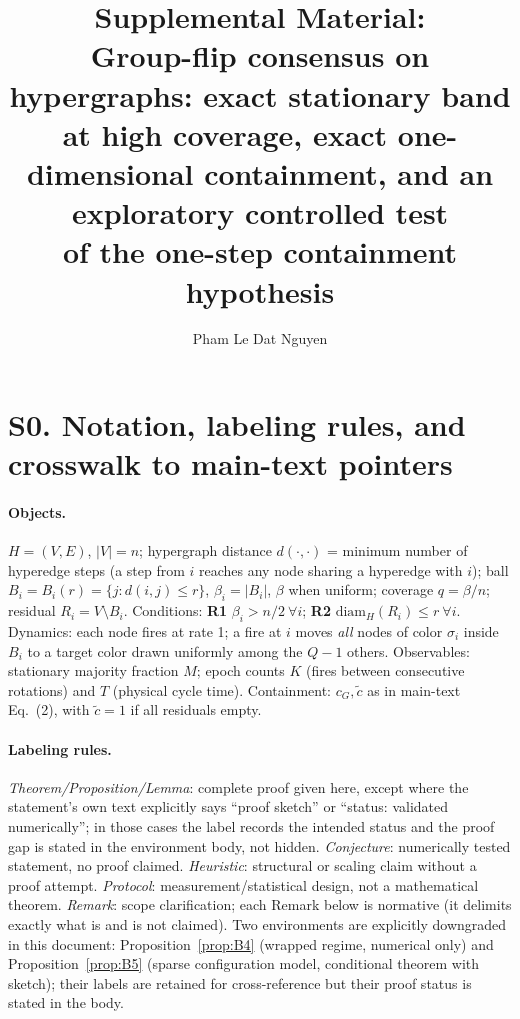 \documentclass[preprint,12pt]{elsarticle}
\newcommand{\ctil}{\tilde{c}}
\newcommand{\cG}{c_G}
\begin{document}
\begin{frontmatter}

\title{Supplemental Material:\\
Group-flip consensus on hypergraphs: exact stationary band at high coverage,
exact one-dimensional containment, and an exploratory controlled test\\
of the one-step containment hypothesis}

\author[1]{Pham Le Dat Nguyen}

\end{frontmatter}

\section*{S0. Notation, labeling rules, and crosswalk to main-text pointers}
\label{sec:S0}

\paragraph{Objects.}
$H=(V,E)$, $|V|=n$; hypergraph distance $d(\cdot,\cdot)$ = minimum number of
hyperedge steps (a step from $i$ reaches any node sharing a hyperedge with
$i$); ball $B_i=B_i(r)=\{j:d(i,j)\le r\}$, $\beta_i=|B_i|$, $\beta$ when
uniform; coverage $q=\beta/n$; residual $R_i=V\setminus B_i$. Conditions:
\textbf{R1} $\beta_i>n/2\ \forall i$; \textbf{R2}
$\mathrm{diam}_H(R_i)\le r\ \forall i$. Dynamics: each node fires at rate
1; a fire at $i$ moves \emph{all} nodes of color $\sigma_i$ inside $B_i$ to
a target color drawn uniformly among the $Q-1$ others. Observables:
stationary majority fraction $M$; epoch counts $K$ (fires between
consecutive rotations) and $T$ (physical cycle time). Containment:
$\cG,\ctil$ as in main-text Eq.~(2), with $\ctil=1$ if all residuals empty.

\paragraph{Labeling rules.}
\emph{Theorem/Proposition/Lemma}: complete proof given here, except where
the statement's own text explicitly says ``proof sketch'' or ``status:
validated numerically''; in those cases the label records the intended
status and the proof gap is stated in the environment body, not hidden.
\emph{Conjecture}: numerically tested statement, no proof claimed.
\emph{Heuristic}: structural or scaling claim without a proof attempt.
\emph{Protocol}: measurement/statistical design, not a mathematical
theorem. \emph{Remark}: scope clarification; each Remark below is
normative (it delimits exactly what is and is not claimed). Two
environments are explicitly downgraded in this document:
Proposition~\ref{prop:B4} (wrapped regime, numerical only) and
Proposition~\ref{prop:B5} (sparse configuration model, conditional
theorem with sketch); their labels are retained for cross-reference but
their proof status is stated in the body.
\end{document}
